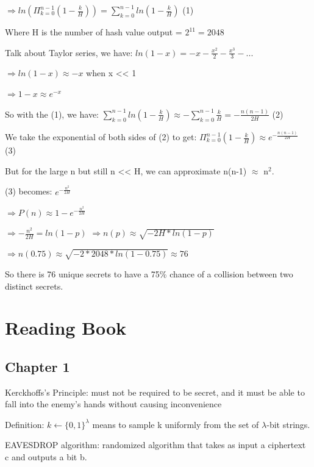 \documentclass[12pt, a4paper, oneside]{report}
\begin{document}
$\Rightarrow ln(\Pi_{k = 0}^{n-1} (1 - \frac{k}{H})) = \sum_{k = 0}^{n-1} ln(1 - \frac{k}{H})$ (1)

Where H is the number of hash value output = $2^{11} = 2048$

Talk about Taylor series, we have:
$ln (1-x) = -x - \frac{x^2}{2} - \frac{x^3}{3} - ...$

$\Rightarrow ln (1-x) \approx -x$ when x << 1

$\Rightarrow 1-x \approx e^{-x}$

So with the (1), we have:
$\sum_{k = 0}^{n-1} ln(1 - \frac{k}{H}) \approx - \sum_{k = 0}^{n-1} \frac{k}{H} = -\frac{n(n-1)}{2H}$ (2)

We take the exponential of both sides of (2) to get:
$\Pi_{k = 0}^{n-1} (1 - \frac{k}{H}) \approx e^{-\frac{n(n-1)}{2H}}$ (3)

But for the large n but still n << H, we can approximate n(n-1) $\approx$ n$^2$.

(3) becomes:
$e ^{-\frac{n^2}{2H}}$ 

$\Rightarrow P(n) \approx 1 - e^{-\frac{n^2}{2H}}$

$\Rightarrow - \frac{n^2}{2H} = ln(1 - p)$
$\Rightarrow n(p) \approx \sqrt{-2H * ln(1 - p)}$

$\Rightarrow n(0.75) \approx \sqrt{-2 * 2048 * ln(1 - 0.75)} \approx 76$

So there is 76 unique secrets to have a 75\% chance of a collision between two distinct secrets.

\chapter{Reading Book}
\section{Chapter 1}
Kerckhoffs's Principle: must not be required to be secret, and it must be able to fall into the enemy's hands without causing inconvenience

Definition: $k \leftarrow \{0, 1\}^\lambda$ means to sample k uniformly from the set of $\lambda$-bit strings.

EAVESDROP algorithm: randomized algorithm that takes as input a ciphertext c and outputs a bit b.
\end{document}
